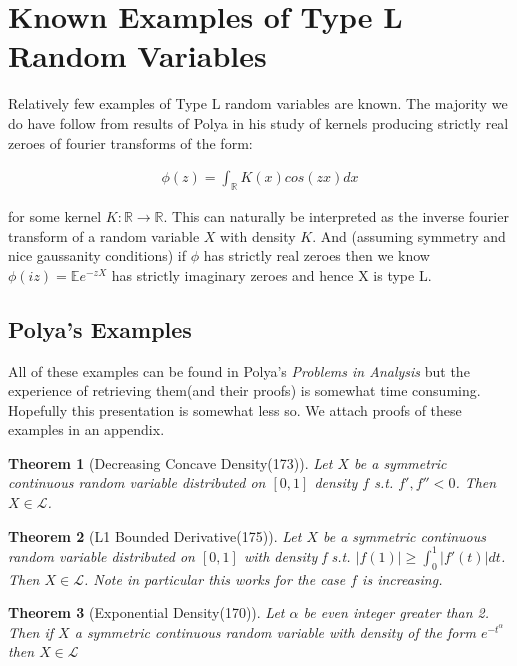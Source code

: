 \documentclass[10pt]{article}
\newcommand{\E}{\mathbb{E}}
\newcommand{\1}{\textbf{1}}
\newcommand{\R}{\mathbb{R}}
\newcommand{\lL}{\mathcal{L}}
\newtheorem{theorem}{Theorem}
\theoremstyle{remark}
\theoremstyle{definition}
\begin{document}
\section{Known Examples of Type L Random Variables}

Relatively few examples of Type L random variables are known. The majority we do have follow from results of Polya in his study of kernels producing strictly real zeroes of fourier transforms of the form:

\begin{align*}
	\phi(z) = \int_{\R} K(x)cos(zx)dx
\end{align*}

for some kernel $K : \R \to \R$. This can naturally be interpreted as the inverse fourier transform of a random variable $X$ with density $K$. And (assuming symmetry and nice gaussanity conditions) if $\phi$ has strictly real zeroes then we know $\phi(iz) = \E e^{-zX}$ has strictly imaginary zeroes and hence X is type L.

\subsection{Polya's Examples}

All of these examples can be found in Polya's \textit{Problems in Analysis} but the experience of retrieving them(and their proofs) is somewhat time consuming. Hopefully this presentation is somewhat less so. We attach proofs of these examples in an appendix. 

\begin{theorem}[Decreasing Concave Density(173)] \label{CCDNSTY}
	Let $X$ be a symmetric continuous random variable distributed on $[0,1]$ density $f$ s.t. $f',f'' < 0$. Then $X \in \lL$.
\end{theorem}

\begin{theorem}[L1 Bounded Derivative(175)] \label{LBDER}
	Let $X$ be a symmetric continuous random variable distributed on $[0,1]$ with density f s.t. $|f(1)| \geq \int_0^1 |f'(t)|dt$. Then $X \in \lL$. Note in particular this works for the case $f$ is increasing.
\end{theorem}

\begin{theorem}[Exponential Density(170)] \label{EXPDEN}
	Let $\alpha$ be even integer greater than 2. Then if $X$ a symmetric continuous random variable with density of the form $e^{-t^{\alpha}}$ then $X \in \lL$
\end{theorem}
\end{document}
